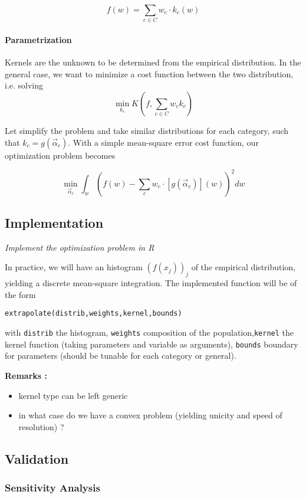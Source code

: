 \[
f(w) = \sum_{c\in C} w_c \cdot k_c (w)
\]

\paragraph{Parametrization}

Kernels are the unknown to be determined from the empirical distribution. In the general case, we want to minimize a cost function between the two distribution, i.e. solving
\[\min_{k_c} K(f,\sum_{c\in C} w_c k_c)\]

Let simplify the problem and take similar distributions for each category, such that $k_c = g(\vec{\alpha}_c)$. With a simple mean-square error cost function, our optimization problem becomes

\[
\min_{\vec{\alpha}_c} \int_w \left(f(w) - \sum_c w_c \cdot \left[ g(\vec{\alpha}_c)\right] (w) \right)^2 dw
\]


\subsection{Implementation}

\textit{Implement the optimization problem in R}

In practice, we will have an histogram $\left(f(x_j)\right)_j$ of the empirical distribution, yielding a discrete mean-square integration. The implemented function will be of the form

\texttt{extrapolate(distrib,weights,kernel,bounds)}

with \texttt{distrib} the histogram, \texttt{weights} composition of the population,\texttt{kernel} the kernel function (taking parameters and variable as arguments), \texttt{bounds} boundary for parameters (should be tunable for each category or general).

\medskip

\textbf{Remarks :}
\begin{itemize}
\item kernel type can be left generic
\item in what case do we have a convex problem (yielding unicity and speed of resolution) ?
\end{itemize}


\subsection{Validation}

\subsubsection{Sensitivity Analysis}




